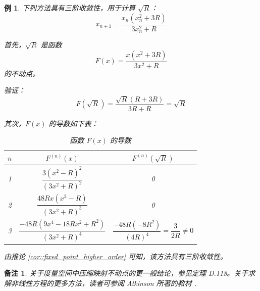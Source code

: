 \documentclass[a4paper]{ctexart}
\newtheorem{remark}{备注}
\newtheorem{example}[theorem]{例}
\numberwithin{theorem}{section}
\numberwithin{equation}{section}
\numberwithin{figure}{section}
\numberwithin{remark}{section}
\begin{document}
\begin{example}
下列方法具有三阶收敛性，用于计算 \( \sqrt{R} \)：
\begin{equation}
x_{n+1} = \frac{x_n (x_n^2 + 3R)}{3x_n^2 + R}
\end{equation}

首先，\( \sqrt{R} \) 是函数
\begin{equation}
F(x) = \frac{x(x^2 + 3R)}{3x^2 + R}
\end{equation}
的不动点。

验证：
\begin{equation}
F(\sqrt{R}) = \frac{\sqrt{R}(R + 3R)}{3R + R} = \sqrt{R}
\end{equation}

其次，\( F(x) \) 的导数如下表：

\begin{table}
\centering
\caption{函数 \( F(x) \) 的导数}
\begin{tabular}{@{}c|c|c@{}}
\toprule
\( n \) & \( F^{(n)}(x) \) & \( F^{(n)}(\sqrt{R}) \) \\
\midrule
1 & \( \dfrac{3(x^2 - R)^2}{(3x^2 + R)^2} \) & 0 \\
2 & \( \dfrac{48Rx(x^2 - R)}{(3x^2 + R)^3} \) & 0 \\
3 & \( \dfrac{-48R(9x^4 - 18Rx^2 + R^2)}{(3x^2 + R)^4} \) & \( \dfrac{-48R(-8R^2)}{(4R)^4} = \dfrac{3}{2R} \ne 0 \) \\
\bottomrule
\end{tabular}
\end{table}

由推论 \ref{cor::fixed_point_higher_order} 可知，该方法具有三阶收敛性。
\end{example}

\begin{remark}
关于度量空间中压缩映射不动点的更一般结论，参见定理 D.118。关于求解非线性方程的更多方法，读者可参阅 Atkinson 所著的教材 \cite[第二章]{Atkinson1989Introduction}.
\end{remark}




\end{document}
